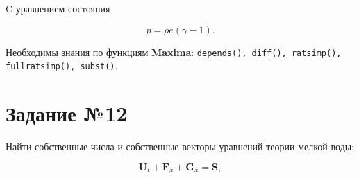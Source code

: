 %

	C уравнением состояния

	\begin{equation}
		p = \rho e \left( \gamma - 1 \right).
	\end{equation}

	
	Необходимы знания по функциям \textbf{Maxima}: {\tt depends(), diff(), ratsimp(), fullratsimp(), subst()}.

\section*{Задание №12}

	Найти собственные числа и собственные векторы уравнений теории мелкой воды:
	
	\begin{equation}
		\mathbf{U}_{t} + \mathbf{F}_{x} + \mathbf{G}_{x} = \mathbf{S},
	\end{equation}
	
